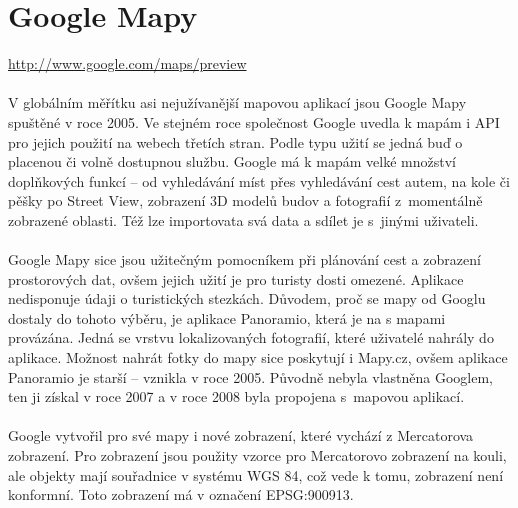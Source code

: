 \documentclass[11pt,a4paper,titlepage,oneside]{book}
\begin{document}
	\section{Google Mapy}
		\url{http://www.google.com/maps/preview}

                

		\paragraph{} V globálním měřítku asi nejužívanější mapovou aplikací jsou Google Mapy spuštěné v roce 2005. Ve stejném roce společnost Google uvedla k mapám i API pro jejich použití na webech třetích stran. Podle typu užití se jedná buď o placenou či volně dostupnou službu. Google má k mapám velké množství doplňkových funkcí -- od vyhledávání míst přes vyhledávání cest autem, na kole či pěšky po Street View, zobrazení 3D modelů budov a fotografií z~momentálně zobrazené oblasti. Též lze importovata svá data a sdílet je s~jinými uživateli.


		\paragraph{} Google Mapy sice jsou užitečným pomocníkem při plánování cest a zobrazení prostorových dat, ovšem jejich užití je pro turisty dosti omezené. Aplikace nedisponuje údaji o turistických stezkách. Důvodem, proč se mapy od Googlu dostaly do tohoto výběru, je aplikace Panoramio, která je na s mapami provázána. Jedná se vrstvu lokalizovaných fotografií, které uživatelé nahrály do aplikace. Možnost nahrát fotky do mapy sice poskytují i  Mapy.cz, ovšem aplikace Panoramio je starší -- vznikla v roce 2005. Původně nebyla vlastněna Googlem, ten ji získal v roce 2007 a v roce 2008 byla propojena s~mapovou aplikací. 


		\paragraph{}  Google vytvořil pro své mapy i nové zobrazení, které vychází z Mercatorova zobrazení. Pro zobrazení jsou použity vzorce pro Mercatorovo zobrazení na kouli, ale objekty mají  souřadnice v systému WGS 84, což vede k tomu, zobrazení není konformní.\label{google_mercator} Toto zobrazení má v označení EPSG:900913.
\end{document}
